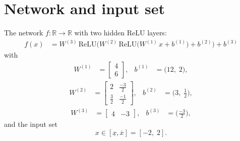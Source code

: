 \documentclass[11pt]{article}
\begin{document}
\section{Network and input set}
The network $f:\mathbb{R} \to \mathbb{R}$ with two hidden ReLU layers:
\begin{align*}
f(x) &= W^{(3)}\,\mathrm{ReLU}\bigl(W^{(2)}\,\mathrm{ReLU}\bigl(W^{(1)}\,x + b^{(1)}\bigr) + b^{(2)}\bigr) + b^{(3)}
\end{align*}
with
\begin{align*}
W^{(1)} &= \begin{bmatrix}
4 \\
6
\end{bmatrix}, & b^{(1)} &= \bigl(12,\; 2\bigr),
\end{align*}
\begin{align*}
W^{(2)} &= \begin{bmatrix}
2 & \frac{-3}{2} \\
\frac{3}{2} & \frac{-1}{2}
\end{bmatrix}, & b^{(2)} &= \bigl(3,\; \frac{1}{2}\bigr),
\end{align*}
\begin{align*}
W^{(3)} &= \begin{bmatrix}
4 & -3
\end{bmatrix}, & b^{(3)} &= \bigl(\frac{-3}{2}\bigr),
\end{align*}
and the input set
\begin{equation*}
 x \in [\underline{x}, \overline{x}] = [-2,\; 2].
\end{equation*}
\end{document}
